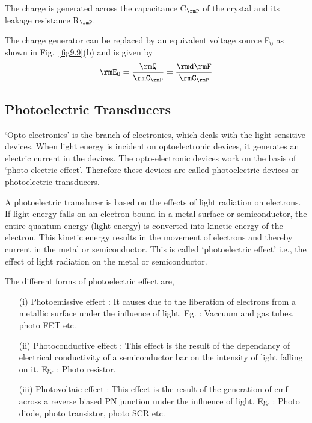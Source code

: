 The charge is generated across the capacitance C$_\rmP$ of the crystal
and its leakage resistance R$_\rmP$.

The charge generator can be replaced by an equivalent voltage source
E$_0$ as shown in Fig.~\ref{fig9.9}(b) and is given by 
\begin{equation}
\rmE_0 = \dfrac{\rmQ}{\rmC_\rmP}  = \dfrac{\rmd\rmF}{\rmC_\rmP} \label{eq9.9}
\end{equation}

\subsection{Photoelectric Transducers}\label{sec9.7.2}
`Opto-electronics' is the branch of electronics, which deals with the
light sensitive devices. When light energy is incident on
optoelectronic devices, it generates an electric current in the
devices. The opto-electronic devices work on the basis of
`photo-electric effect'. Therefore these devices are called
photoelectric devices or photoelectric transducers. 

A photoelectric transducer is based on the effects of light radiation
on electrons. If light energy falls on an electron bound in a metal
surface or semiconductor, the entire quantum energy (light energy) is
converted into kinetic energy of the electron. This kinetic energy
results in the movement of electrons and thereby current in the metal
or semiconductor. This is called `photoelectric effect' i.e., the
effect of light radiation on the metal or semiconductor.

The different forms of photoelectric effect are, 
\begin{itemize}
\item[(i)] Photoemissive  effect : It causes due to the liberation of
electrons from a metallic surface under the influence of light. Eg. :
Vaccuum and gas tubes, photo FET etc.

\item[(ii)] Photoconductive effect : This effect is the result of the
dependancy of electrical conductivity of a semiconductor bar on the
intensity of light falling on it. Eg. : Photo resistor. 

\item[(iii)] Photovoltaic  effect : This effect is the result of the
generation of emf across a reverse biased PN junction under the
influence of light. Eg. : Photo diode, photo transistor, photo SCR etc.
\end{itemize}

\label{9end}
